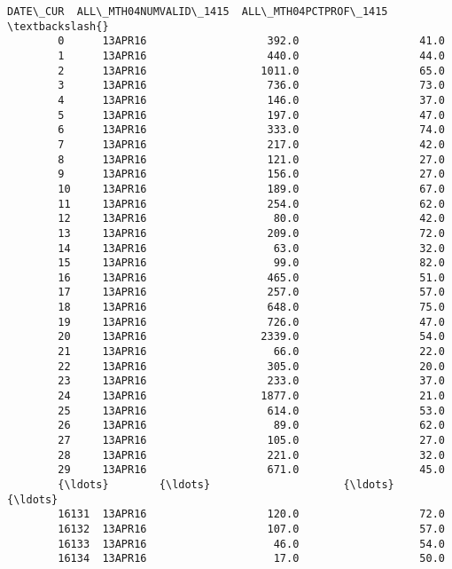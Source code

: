 \documentclass[11pt]{article}
\begin{document}
\begin{Verbatim}[commandchars=\\\{\}]
              DATE\_CUR  ALL\_MTH04NUMVALID\_1415  ALL\_MTH04PCTPROF\_1415  \textbackslash{}
        0      13APR16                   392.0                   41.0   
        1      13APR16                   440.0                   44.0   
        2      13APR16                  1011.0                   65.0   
        3      13APR16                   736.0                   73.0   
        4      13APR16                   146.0                   37.0   
        5      13APR16                   197.0                   47.0   
        6      13APR16                   333.0                   74.0   
        7      13APR16                   217.0                   42.0   
        8      13APR16                   121.0                   27.0   
        9      13APR16                   156.0                   27.0   
        10     13APR16                   189.0                   67.0   
        11     13APR16                   254.0                   62.0   
        12     13APR16                    80.0                   42.0   
        13     13APR16                   209.0                   72.0   
        14     13APR16                    63.0                   32.0   
        15     13APR16                    99.0                   82.0   
        16     13APR16                   465.0                   51.0   
        17     13APR16                   257.0                   57.0   
        18     13APR16                   648.0                   75.0   
        19     13APR16                   726.0                   47.0   
        20     13APR16                  2339.0                   54.0   
        21     13APR16                    66.0                   22.0   
        22     13APR16                   305.0                   20.0   
        23     13APR16                   233.0                   37.0   
        24     13APR16                  1877.0                   21.0   
        25     13APR16                   614.0                   53.0   
        26     13APR16                    89.0                   62.0   
        27     13APR16                   105.0                   27.0   
        28     13APR16                   221.0                   32.0   
        29     13APR16                   671.0                   45.0   
        {\ldots}        {\ldots}                     {\ldots}                    {\ldots}   
        16131  13APR16                   120.0                   72.0   
        16132  13APR16                   107.0                   57.0   
        16133  13APR16                    46.0                   54.0   
        16134  13APR16                    17.0                   50.0   

\end{Verbatim}
\end{document}
